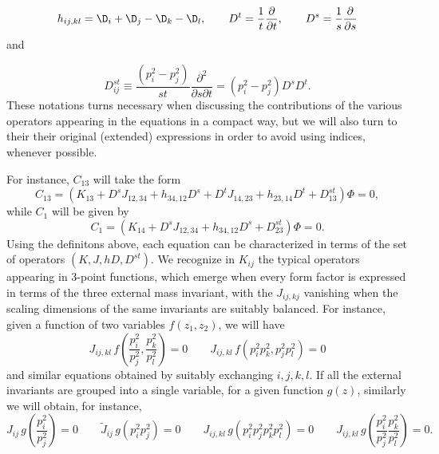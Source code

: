 \documentclass[a4paper,11pt,openright,twoside]{book}
\numberwithin{equation}{section}
\begin{document}
{\begin{equation}
	h_{ij,kl}=\D_i+\D_j-\D_k-\D_l,\qquad
	D^{t}=\frac{1}{t}\frac{\partial}{\partial t},\qquad  D^{s}=\frac{1}{s}\frac{\partial}{\partial s}
\end{equation}
and
{\begin{equation}
		\label{dst}
		D^{s t}_{ij}\equiv\frac{(p_i^2-p_j^2)}{s t}\frac{\partial^2}{\partial s\partial t}=(p_i^2-p_j^2) D^s D^t.
	\end{equation}
	These notations turns necessary when discussing the contributions of the various operators appearing in the equations in a compact way, but we will also turn to their their original (extended) expressions in order to avoid using indices, whenever possible.
	
	For instance, $C_{13}$ will take the form 
	\begin{equation}
		C_{13}=\left( {K}_{13} + D^s J_{12,34} +h_{34,12}D^s + D^t J_{14,23} +h_{23,14}D^t + D_{13}^{s t}\right)\Phi=0,
	\end{equation}
	while $C_1$ will be given by 
	\begin{equation}
		C_1=\left({K}_{14} +D^s J_{12,34}+ h_{34,12}D^s +D_{23}^{st}\right)\Phi=0.
		\label{intform}
	\end{equation}
	Using the definitons above, each equation can be characterized in terms of the set of operators $(K, J, h D, D^{s t})$. 
	We recognize in ${K}_{ij}$ the typical operators appearing in 3-point functions, which emerge when every form factor is 
	expressed in terms of the three external mass invariant, with the $J_{ij,kj}$ vanishing when the scaling dimensions of the same invariants are suitably balanced. For instance, given a function of two variables $f(z_1,z_2)$, 
	we will have 
	\begin{equation}
		J_{ij,kl}\, f\left(\frac{p_i^2}{p_j^2},\frac{p_k^2}{p_l^2}\right)=0 \qquad J_{ij,kl}\, f\left(p_i^2 p_k^2,p_j^2 p_l^2\right)=0
	\end{equation}
	and similar equations obtained by suitably exchanging $i,j,k,l$. If all the external invariants are grouped into a single 
	variable, for a given function $g(z)$, similarly we will obtain, for instance,
	\begin{equation}
		J_{ij} \,g\left(\frac{p_i^2}{ p_j^2}\right)=0 \qquad \tilde{J}_{ij} \,g\left({p_i^2}{ p_j^2}\right)=0 \qquad  J_{ij,kl}\,g(p_i^2 p_j^2 p_k^2 p_l^2)=0 \qquad J_{ij,kl}\, g\left( \frac{p_i^2}{ p_j^2}\frac{ p_k^2}{ p_l^2}\right)=0.
		\label{lastref}
	\end{equation}
	
}}
\end{document}
